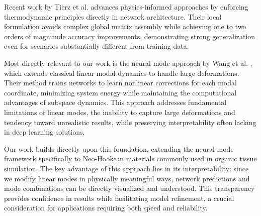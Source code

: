 Recent work by Tierz et al. \cite{Tierz_Alfaro_González_Chinesta_Cueto_2025} advances physics-informed approaches by enforcing thermodynamic principles directly in network architecture. Their local formulation avoids complex global matrix assembly while achieving one to two orders of magnitude accuracy improvements, demonstrating strong generalization even for scenarios substantially different from training data.

Most directly relevant to our work is the neural mode approach by Wang et al. \cite{Wang_Du_Coros_Thomaszewski_2024}, which extends classical linear modal dynamics \cite{Pentland_Williams_1989} to handle large deformations. Their method trains networks to learn nonlinear corrections for each modal coordinate, minimizing system energy while maintaining the computational advantages of subspace dynamics. This approach addresses fundamental limitations of linear modes, the inability to capture large deformations and tendency toward unrealistic results, while preserving interpretability often lacking in deep learning solutions.

Our work builds directly upon this foundation, extending the neural mode framework specifically to Neo-Hookean materials commonly used in organic tissue simulation. The key advantage of this approach lies in its interpretability: since we modify linear modes in physically meaningful ways, network predictions and mode combinations can be directly visualized and understood. This transparency provides confidence in results while facilitating model refinement, a crucial consideration for applications requiring both speed and reliability.
